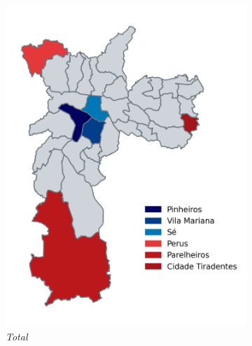 \documentclass[12pt,a4paper]{article}
\theoremstyle{break}
\begin{document}
\begin{figure}[htbp]
  \centering
  \begin{subfigure}[b]{0.32\textwidth}
    \includegraphics[width=\textwidth]{q1_a.png}
    \caption*{\emph{Total}}
  \end{subfigure}
  \hfill %
  \begin{subfigure}[b]{0.32\textwidth}

\end{subfigure}
\end{figure}
\end{document}
